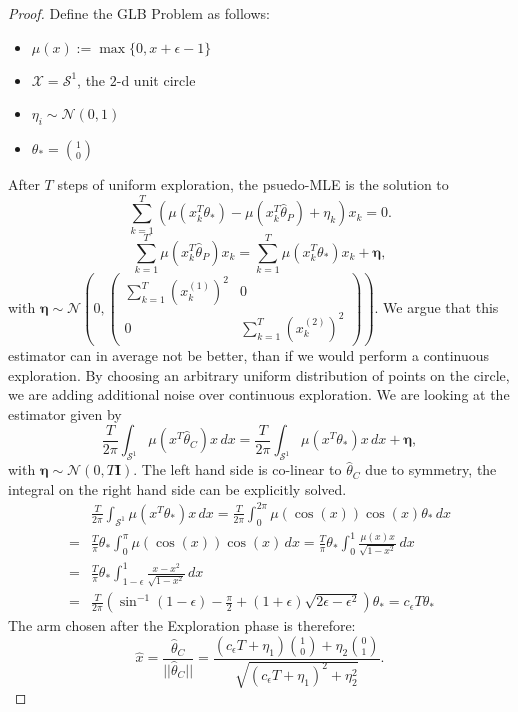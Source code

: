 \documentclass[twoside]{article} \usepackage{aistats2017}
\begin{document}
\begin{proof}
    Define the GLB Problem as follows:\\
    \begin{itemize}
    \item $\mu(x) := \max\{0, x+\epsilon-1\}$
    \item $\mathcal{X} = \mathcal{S}^1$, the $2$-d unit circle
    \item $\eta_i\sim \mathcal{N}(0,1)$
    \item $\theta_* = \binom{1}{0}
    $
    \end{itemize}
    After $T$ steps of uniform exploration, the psuedo-MLE is the solution to
    $$\sum_{k=1}^T\left(\mu(x_k^T\theta_*)-\mu(x_k^T\hat{\theta}_P)+\eta_k\right)x_k=0.$$
    $$\sum_{k=1}^T\mu(x_k^T\hat{\theta}_P)x_k = \sum_{k=1}^T\mu(x_k^T\theta_*)x_k + \boldsymbol{\eta},$$
    with $\boldsymbol{\eta}\sim \mathcal{N}\left(0,\begin{pmatrix}
    \sum_{k=1}^T(x_k^{(1)})^2&0\\
    0&\sum_{k=1}^T(x_k^{(2)})^2
    \end{pmatrix}\right)$.
    We argue that this estimator can in average not be better, than if we would perform a continuous exploration.
    By choosing an arbitrary uniform distribution of points on the circle, we are adding additional noise over continuous exploration. We are looking at the estimator given by
    $$\frac{T}{2\pi}\int_{\mathcal{S}^1}\mu(x^T\hat{\theta}_C)x\,dx = \frac{T}{2\pi}\int_{\mathcal{S}^1}\mu(x^T\theta_*)x\,dx + \boldsymbol{\eta},$$
    with $\boldsymbol{\eta}\sim \mathcal{N}(0,T\mathbf{I})$.
    The left hand side is co-linear to $\hat{\theta}_C$ due to symmetry, the integral on the right hand side can be explicitly solved.
    \begin{align*}
    &\frac{T}{2\pi}\int_{\mathcal{S}^1}\mu(x^T\theta_*)x\,dx = \frac{T}{2\pi}\int_{0}^{2\pi}\mu(\cos(x))\cos(x)\theta_*\,dx \\
    =&\frac{T}{\pi}\theta_*\int_{0}^{\pi}\mu(\cos(x))\cos(x)\,dx=\frac{T}{\pi}\theta_*\int_{0}^{1}\frac{\mu(x)x}{\sqrt{1-x^2}}\,dx\\
    =&\frac{T}{\pi}\theta_*\int_{1-\epsilon}^{1}\frac{x-x^2}{\sqrt{1-x^2}}\,dx\\
    =&\frac{T}{2\pi}\left(\sin^{-1}(1-\epsilon)-\frac{\pi}{2}+(1+\epsilon)\sqrt{2\epsilon-\epsilon^2}\right)\theta_*=c_\epsilon T\theta_*
    \end{align*}
    The arm chosen after the Exploration phase is therefore:
    $$\hat{x} = \frac{\hat{\theta}_C}{||\hat{\theta}_C||}=\frac{(c_\epsilon T+\eta_1)\binom{1}{0}+\eta_2\binom{0}{1}}{\sqrt{(c_\epsilon T+\eta_1)^2+\eta_2^2}}.$$

\end{proof}
\end{document}
